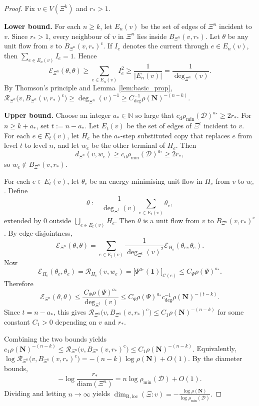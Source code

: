 \documentclass{article}
\theoremstyle{plain}
\theoremstyle{definition}
\newcommand{\dist}{\mathrm{d}}
\newcommand{\diam}{\mathrm{diam}}
\newcommand{\Reff}{\mathscr{R}}
\begin{document}
\begin{proof}
Fix $v\in V(\Xi^k)$ and $r_*>1$.

\textbf{Lower bound.}
For each $n\ge k$, let $E_n(v)$ be the set of edges of $\Xi^n$ incident to $v$.
Since $r_*>1$, every neighbour of $v$ in $\Xi^n$ lies inside $B_{\Xi^n}(v,r_*)$.
Let $\theta$ be any unit flow from $v$ to $B_{\Xi^n}(v,r_*)^{\mathrm c}$.
If $I_e$ denotes the current through $e\in E_n(v)$, then
$
\sum_{e\in E_n(v)} I_e=1.
$
Hence
\[
\mathcal E_{\Xi^n}(\theta,\theta)
\ge
\sum_{e\in E_n(v)} I_e^2
\ge
\frac{1}{|E_n(v)|}
=
\frac{1}{\deg_{\Xi^n}(v)}.
\]
By Thomson's principle and Lemma~\ref{lem:basic_prop},
$
\Reff_{\Xi^n}\bigl(v,B_{\Xi^n}(v,r_*)^{\mathrm c}\bigr)
\ge
\deg_{\Xi^n}(v)^{-1}
\ge
C_{\deg}^{-1}\rho(\mathbf N)^{-(n-k)}.
$

\textbf{Upper bound.}
Choose an integer $a_*\in\mathbb N$ so large that
$
c_{\dist}\rho_{\min}(\mathcal D)^{a_*}\ge 2r_*.
$
For $n\ge k+a_*$, set $t:=n-a_*$.
Let $E_t(v)$ be the set of edges of $\Xi^t$ incident to $v$.
For each $e\in E_t(v)$, let $H_e$ be the $a_*$-step substituted copy that replaces $e$ from level $t$ to level $n$, and let $w_e$ be the other terminal of $H_e$.
Then
\[
d_{\Xi^n}(v,w_e)\ge c_{\dist}\rho_{\min}(\mathcal D)^{a_*}\ge 2r_*,
\]
so $w_e\notin B_{\Xi^n}(v,r_*)$.

For each $e\in E_t(v)$, let $\theta_e$ be an energy-minimising unit flow in $H_e$ from $v$ to $w_e$.
Define
\[
\theta:=\frac{1}{\deg_{\Xi^t}(v)}\sum_{e\in E_t(v)} \theta_e,
\]
extended by $0$ outside $\bigcup_{e\in E_t(v)} H_e$.
Then $\theta$ is a unit flow from $v$ to $B_{\Xi^n}(v,r_*)^{\mathrm c}$.
By edge-disjointness,
\[
\mathcal E_{\Xi^n}(\theta,\theta)
=
\sum_{e\in E_t(v)}
\frac{1}{\deg_{\Xi^t}(v)^2}\mathcal E_{H_e}(\theta_e,\theta_e).
\]
Now
\[
\mathcal E_{H_e}(\theta_e,\theta_e)
=
\Reff_{H_e}(v,w_e)
=
\big[\Psi^{a_*}(\mathbf 1)\big]_{\mathscr C(e)}
\le
C_{\Psi}\rho(\Psi)^{a_*}.
\]
Therefore
\[
\mathcal E_{\Xi^n}(\theta,\theta)
\le
\frac{C_{\Psi}\rho(\Psi)^{a_*}}{\deg_{\Xi^t}(v)}
\le
C_{\Psi}\rho(\Psi)^{a_*} c_{\deg}^{-1}\rho(\mathbf N)^{-(t-k)}.
\]
Since $t=n-a_*$, this gives
$
\Reff_{\Xi^n}\bigl(v,B_{\Xi^n}(v,r_*)^{\mathrm c}\bigr)
\le
C_1\rho(\mathbf N)^{-(n-k)}
$
for some constant $C_1>0$ depending on $v$ and $r_*$.

Combining the two bounds yields
$
c_1\rho(\mathbf N)^{-(n-k)}
\le
\Reff_{\Xi^n}\bigl(v,B_{\Xi^n}(v,r_*)^{\mathrm c}\bigr)
\le
C_1\rho(\mathbf N)^{-(n-k)}.
$
Equivalently,
$
\log \Reff_{\Xi^n}\bigl(v,B_{\Xi^n}(v,r_*)^{\mathrm c}\bigr)
=
-(n-k)\log\rho(\mathbf N)+O(1).
$
By the diameter bounds,
\[
-\log\frac{r_*}{\diam(\Xi^n)}
=
n\log\rho_{\min}(\mathcal D)+O(1).
\]
Dividing and letting $n\to\infty$ yields
$
\dim_{\mathrm{R,loc}}(\Xi:v)
=
-\frac{\log \rho(\mathbf N)}{\log \rho_{\min}(\mathcal D)}.
$
\end{proof}
\end{document}
